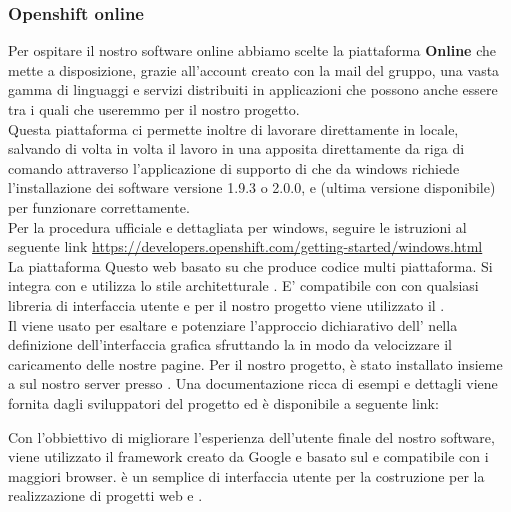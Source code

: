 \documentclass[a4paper,11pt]{article}
\begin{document}
			\subsubsection{Openshift online} \label{s:openshift}
			Per ospitare il nostro software online abbiamo scelte la piattaforma \textbf{ Online } che mette a disposizione, grazie all'account creato con la mail del gruppo, una vasta gamma di linguaggi e servizi distribuiti in applicazioni che possono anche essere  tra i quali  che useremmo per il nostro progetto.\\
			Questa piattaforma ci permette inoltre di lavorare direttamente in locale, salvando di volta in volta il lavoro in una apposita  direttamente da riga di comando attraverso l'applicazione di supporto di   che da windows richiede l'installazione dei software  versione 1.9.3 o 2.0.0,   e (ultima versione disponibile)  per funzionare correttamente.\\
			Per la procedura ufficiale e dettagliata per windows, seguire le istruzioni al seguente link \url{https://developers.openshift.com/getting-started/windows.html} \\
			
			
			 \label{s:meteor}
			La piattaforma  Questo  web basato su  che produce codice  multi piattaforma. Si integra con  e utilizza lo stile architetturale . E' compatibile con con qualsiasi libreria  di interfaccia utente e per il nostro progetto viene utilizzato il  .\\
			
			\label{s:angular}
			Il   viene usato per esaltare e potenziare l'approccio dichiarativo dell' nella definizione dell'interfaccia grafica sfruttando la  in modo da velocizzare il caricamento delle nostre pagine. Per il nostro progetto,  è stato installato insieme a  sul nostro server presso . Una documentazione ricca di esempi e dettagli viene fornita dagli sviluppatori del progetto ed è disponibile a seguente link: \url{}
			
			Con l'obbiettivo di migliorare l'esperienza dell'utente finale del nostro software, viene utilizzato il framework  creato da Google e basato sul  e compatibile con i maggiori browser.  è un semplice  di interfaccia utente  per la costruzione per la realizzazione di progetti web  e . \\
			
\end{document}
